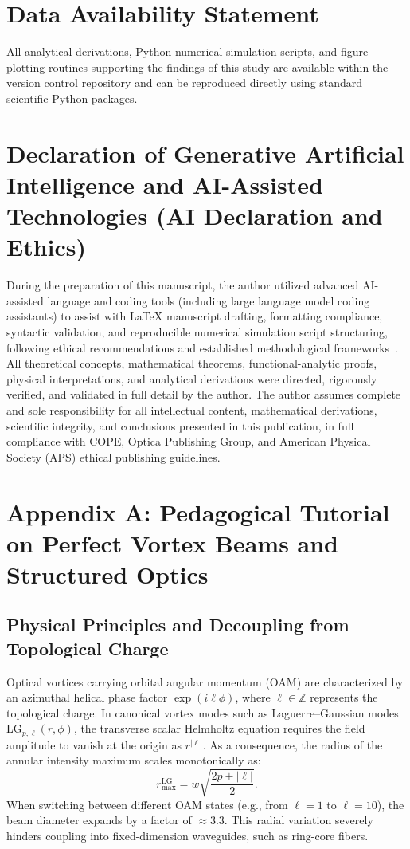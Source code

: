 \documentclass{optica-article}
\begin{document}
\section*{Data Availability Statement}
All analytical derivations, Python numerical simulation scripts, and figure plotting routines supporting the findings of this study are available within the version control repository and can be reproduced directly using standard scientific Python packages.

\section*{Declaration of Generative Artificial Intelligence and AI-Assisted Technologies (AI Declaration and Ethics)}
During the preparation of this manuscript, the author utilized advanced AI-assisted language and coding tools (including large language model coding assistants) to assist with LaTeX manuscript drafting, formatting compliance, syntactic validation, and reproducible numerical simulation script structuring, following ethical recommendations and established methodological frameworks~\cite{Jauhiainen2026, Zhu2026PaperBanana, Haber2025}. All theoretical concepts, mathematical theorems, functional-analytic proofs, physical interpretations, and analytical derivations were directed, rigorously verified, and validated in full detail by the author. The author assumes complete and sole responsibility for all intellectual content, mathematical derivations, scientific integrity, and conclusions presented in this publication, in full compliance with COPE, Optica Publishing Group, and American Physical Society (APS) ethical publishing guidelines.

\appendix

\section{Appendix A: Pedagogical Tutorial on Perfect Vortex Beams and Structured Optics}
\label{app:primer}

\subsection{Physical Principles and Decoupling from Topological Charge}

Optical vortices carrying orbital angular momentum (OAM) are characterized by an azimuthal helical phase factor $\exp(i \ell \phi)$, where $\ell \in \mathbb{Z}$ represents the topological charge. In canonical vortex modes such as Laguerre--Gaussian modes $\text{LG}_{p, \ell}(r, \phi)$, the transverse scalar Helmholtz equation requires the field amplitude to vanish at the origin as $r^{|\ell|}$. As a consequence, the radius of the annular intensity maximum scales monotonically as:
\begin{equation}
r_{\max}^{\text{LG}} = w \sqrt{\frac{2p + |\ell|}{2}}.
\end{equation}
When switching between different OAM states (e.g., from $\ell=1$ to $\ell=10$), the beam diameter expands by a factor of $\approx 3.3$. This radial variation severely hinders coupling into fixed-dimension waveguides, such as ring-core fibers.
\end{document}
